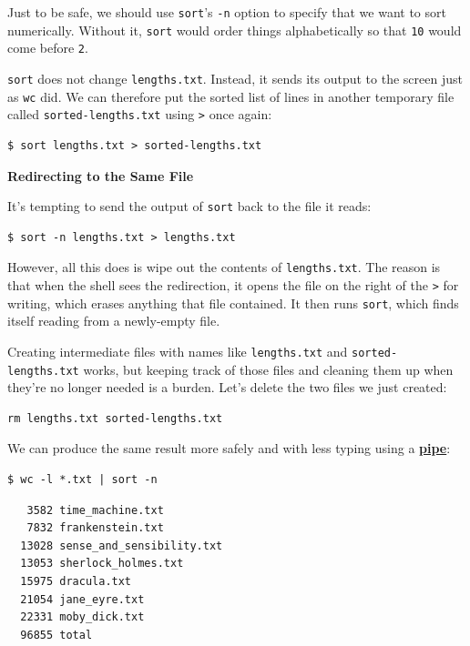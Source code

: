 \documentclass[
]{krantz}
\renewenvironment{quote}{\begin{VF}}{\end{VF}}
\newcommand{\gref}[2]{\hyperlink{#2}{\textbf{#1}}}
\begin{document}
Just to be safe,
we should use \texttt{sort}'s \texttt{-n} option to specify that we want to sort numerically.
Without it,
\texttt{sort} would order things alphabetically
so that \texttt{10} would come before \texttt{2}.

\texttt{sort} does not change \texttt{lengths.txt}.
Instead,
it sends its output to the screen just as \texttt{wc} did.
We can therefore put the sorted list of lines in another temporary file called \texttt{sorted-lengths.txt}
using \texttt{\textgreater{}} once again:

\begin{verbatim}
$ sort lengths.txt > sorted-lengths.txt
\end{verbatim}

\begin{quote}
\textbf{Redirecting to the Same File}

It's tempting to send the output of \texttt{sort} back to the file it reads:

\begin{verbatim}
$ sort -n lengths.txt > lengths.txt
\end{verbatim}

However, all this does is wipe out the contents of \texttt{lengths.txt}.
The reason is that when the shell sees the redirection,
it opens the file on the right of the \texttt{\textgreater{}} for writing,
which erases anything that file contained.
It then runs \texttt{sort}, which finds itself reading from a newly-empty file.
\end{quote}

Creating intermediate files with names like \texttt{lengths.txt} and \texttt{sorted-lengths.txt} works,
but keeping track of those files and cleaning them up when they're no longer needed is a burden.
Let's delete the two files we just created:

\begin{verbatim}
rm lengths.txt sorted-lengths.txt
\end{verbatim}

We can produce the same result more safely and with less typing
using a \gref{pipe}{pipe\_shell}:

\begin{verbatim}
$ wc -l *.txt | sort -n
\end{verbatim}

\begin{verbatim}
   3582 time_machine.txt
   7832 frankenstein.txt
  13028 sense_and_sensibility.txt
  13053 sherlock_holmes.txt
  15975 dracula.txt
  21054 jane_eyre.txt
  22331 moby_dick.txt
  96855 total
\end{verbatim}
\end{document}
